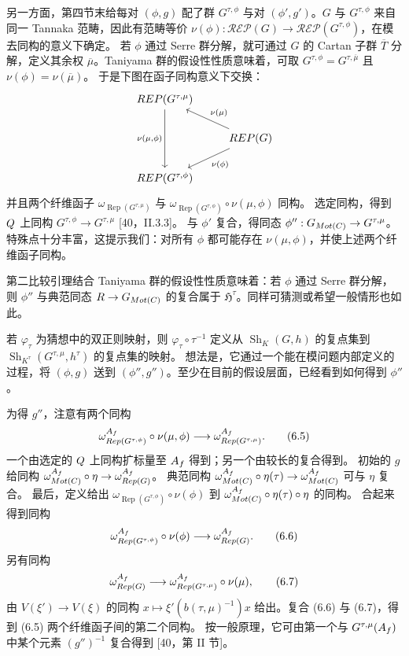 另一方面，第四节末给每对 $(\phi,g)$ 配了群 $G^{\tau,\phi}$ 与对
$(\phi',g')$。$G$ 与 $G^{\tau,\phi}$ 来自同一 Tannaka 范畴，因此有范畴等价
$\nu(\phi):\mathcal{REP}(G)\to\mathcal{REP}(G^{\tau,\phi})$，在模去同构的意义下确定。
若 $\phi$ 通过 Serre 群分解，就可通过 $G$ 的 Cartan 子群 $\overline T$ 分解，定义其余权
$\overline\mu$。Taniyama 群的假设性性质意味着，可取
$G^{\tau,\phi}=G^{\tau,\overline\mu}$ 且 $\nu(\phi)=\nu(\overline\mu)$。
于是下图在函子同构意义下交换：
\[
\begin{tikzcd}
\mathcal{REP}(G^{\tau,\mu})\arrow[dd,"{\nu(\mu,\phi)}"']&\\
&\mathcal{REP}(G)\arrow[ul,"\nu(\mu)"']\arrow[dl,"\nu(\phi)"]\\
\mathcal{REP}(G^{\tau,\phi})&
\end{tikzcd}
\]
并且两个纤维函子
$\omega_{\operatorname{Rep}(G^{\tau,\mu})}$ 与
$\omega_{\operatorname{Rep}(G^{\tau,\phi})}\circ\nu(\mu,\phi)$ 同构。
选定同构，得到 $Q$ 上同构 $G^{\tau,\phi}\to G^{\tau,\mu}$ [40，II.3.3]。
与 $\phi'$ 复合，得同态 $\phi'':G_{Mot(C)}\to G^{\tau,\mu}$。
特殊点十分丰富，这提示我们：对所有 $\phi$ 都可能存在 $\nu(\mu,\phi)$，并使上述两个纤维函子同构。

第二比较引理结合 Taniyama 群的假设性性质意味着：若 $\phi$ 通过 Serre 群分解，则
$\phi''$ 与典范同态 $R\to G_{Mot(C)}$ 的复合属于
$\mathfrak H^\tau$。同样可猜测或希望一般情形也如此。

若 $\varphi_\tau$ 为猜想中的双正则映射，则
$\varphi_\tau\circ\tau^{-1}$ 定义从 $\operatorname{Sh}_K(G,h)$ 的复点集到
$\operatorname{Sh}_{K^\tau}(G^{\tau,\mu},h^\tau)$ 的复点集的映射。
想法是，它通过一个能在模问题内部定义的过程，将 $(\phi,g)$ 送到
$(\phi'',g'')$。至少在目前的假设层面，已经看到如何得到 $\phi''$。

为得 $g''$，注意有两个同构
\begin{equation}
\omega_{Rep(G^{\tau,\phi})}^{A_f}\circ\nu(\mu,\phi)
\longrightarrow\omega_{Rep(G^{\tau,\mu})}^{A_f}.\tag{6.5}
\end{equation}
一个由选定的 $Q$ 上同构扩标量至 $A_f$ 得到；另一个由较长的复合得到。
初始的 $g$ 给同构
$\omega_{Mot(C)}^{A_f}\circ\eta
\to\omega_{Rep(G)}^{A_f}$。
典范同构
$\omega_{Mot(C)}^{A_f}\circ\eta(\tau)
\to\omega_{Mot(C)}^{A_f}$ 可与 $\eta$ 复合。
最后，定义给出
$\omega_{\operatorname{Rep}(G^{\tau,\phi})}\circ\nu(\phi)$ 到
$\omega_{Mot(C)}^{A_f}\circ\eta(\tau)\circ\eta$ 的同构。
合起来得到同构
\begin{equation}
\omega_{Rep(G^{\tau,\phi})}^{A_f}\circ\nu(\phi)
\longrightarrow\omega_{Rep(G)}^{A_f}.\tag{6.6}
\end{equation}
另有同构
\begin{equation}
\omega_{Rep(G)}^{A_f}
\longrightarrow\omega_{Rep(G^{\tau,\mu})}^{A_f}\circ\nu(\mu),\tag{6.7}
\end{equation}
由 $V(\xi')\to V(\xi)$ 的同构
$x\mapsto\xi'(b(\tau,\mu)^{-1})x$ 给出。复合 (6.6) 与 (6.7)，得到 (6.5) 两个纤维函子间的第二个同构。
按一般原理，它可由第一个与 $G^{\tau,\mu}(A_f)$ 中某个元素 $(g'')^{-1}$ 复合得到
[40，第 II 节]。


